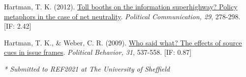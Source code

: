 \documentclass[12pt]{article}
\newcommand{\blankline}{\quad\pagebreak[3]}
\newcommand{\halfblankline}{\quad\vspace{-0.5\baselineskip}\pagebreak[3]}
\begin{document}
\begin{bibenum}
    \item {Hartman, T. K.} (2012). 
          \href{https://10.1080/10584609.2012.694983}
          {Toll booths on the information superhighway? 
          Policy metaphors in the case of net neutrality}. 
          \emph{Political Communication, 29}, 278-298. [IF: 2.42]

    \item {Hartman, T. K.}, \& Weber, C. R. (2009). 
          \href{https://10.1007/s11109-009-9088-y}
          {Who said what? The effects of source cues in issue frames}. 
          \emph{Political Behavior, 31}, 537-558. [IF: 0.87]
          
\end{bibenum}

\blankline

\textit{* Submitted to REF2021 at The University of Sheffield}

\halfblankline
\end{document}
